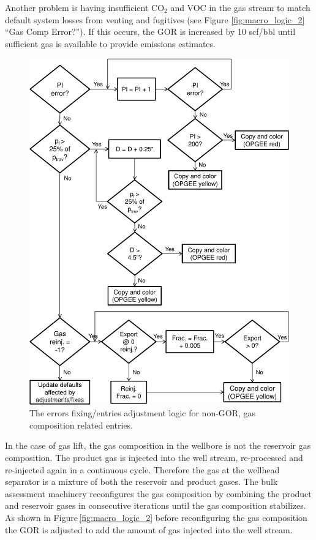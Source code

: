 \documentclass[11pt]{report}
\begin{document}
{{{{Another problem is having insufficient CO$_{2}$ and VOC in the gas stream to match default system losses from venting and fugitives (see Figure \ref{fig:macro_logic_2} ``Gas Comp Error?''). If this occurs, the GOR is increased by 10 scf/bbl until sufficient gas is available to provide emissions estimates.


\begin{figure}[t]
\includegraphics[width=0.8\columnwidth]{images/macro_logic_3.pdf}
\caption{The errors fixing/entries adjustment logic for non-GOR, gas composition related entries.}
\label{fig:macro_logic_3}
\end{figure}

In the case of gas lift, the gas composition in the wellbore is not the reservoir gas composition. The product gas is injected into the well stream, re-processed and re-injected again in a continuous cycle. Therefore the gas at the wellhead separator is a mixture of both the reservoir and product gases. The bulk assessment machinery reconfigures the gas composition by combining the product and reservoir gases in consecutive iterations until the gas composition stabilizes. As shown in Figure\,\ref{fig:macro_logic_2} before reconfiguring the gas composition the GOR is adjusted to add the amount of gas injected into the well stream.\par

}}}}
\end{document}
